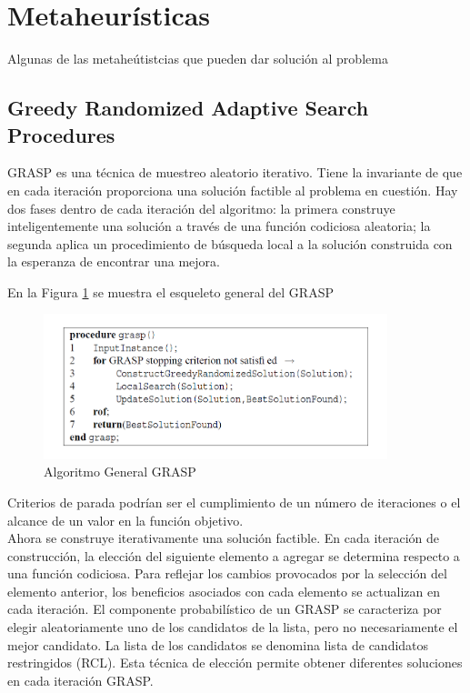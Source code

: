 \documentclass[a4paper,12pt]{book}
\begin{document}
	\section{Metaheurísticas}
	Algunas de las metaheútistcias que pueden dar solución al problema
		\subsection{Greedy Randomized Adaptive Search Procedures}
		GRASP es una técnica de muestreo aleatorio iterativo. Tiene la invariante de que en cada iteración proporciona una solución factible al problema en cuestión. Hay dos fases dentro de cada iteración del algoritmo: la primera construye inteligentemente una solución a través de una función codiciosa aleatoria; la segunda aplica un procedimiento de búsqueda local a la solución construida con la esperanza de encontrar una mejora.
		
		En la Figura \ref{GRASPgeneral} se muestra el esqueleto general del GRASP%
		
		
		\begin{figure}[h]
			\centering
			\includegraphics[width=10cm]{./Graphics/GRASPgeneral.png}
			\caption{Algoritmo General GRASP}
			\label{GRASPgeneral}
		\end{figure}
	
		Criterios de parada podrían ser el cumplimiento de un número de iteraciones o el alcance de un valor en la función objetivo. \\
		
		
	
		Ahora se construye iterativamente una solución factible. En cada iteración de construcción, la elección del siguiente elemento a agregar se determina respecto a una función codiciosa. Para reflejar los cambios provocados por la selección del elemento anterior, los beneficios asociados con cada elemento se actualizan en cada iteración. El componente probabilístico de un GRASP se caracteriza por elegir aleatoriamente uno de los candidatos de la lista, pero no necesariamente el mejor candidato. La lista de los candidatos se denomina lista de candidatos restringidos (RCL). Esta técnica de elección permite obtener diferentes soluciones en cada iteración GRASP.
		
\end{document}
